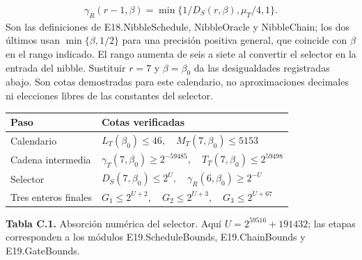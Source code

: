 \documentclass[spanish,11pt,a4paper]{article}
\newcounter{none}
\begin{document}
\[\begin{gathered}
\gamma_R(r-1,\beta)=\min\{1/D_S(r,\beta),\mu_T/4,1\}.
\end{gathered}
\] Son las definiciones de {\ttfamily\small E18.\discretionary{\hbox{\ensuremath{\hookrightarrow}}}{}{}NibbleSchedu\discretionary{\hbox{\ensuremath{\hookrightarrow}}}{}{}le}, {\ttfamily\small NibbleOracle} y {\ttfamily\small NibbleChain}; los dos últimos usan \(\min\{\beta,1/2\}\) para una precisión positiva general, que coincide con \(\beta\) en el rango indicado. El rango aumenta de seis a siete al convertir el selector en la entrada del nibble. Sustituir \(r=7\) y \(\beta=\beta_0\) da las desigualdades registradas abajo. Son cotas demostradas para este calendario, no aproximaciones decimales ni elecciones libres de las constantes del selector.


{\def\LTcaptype{none} %
\begin{longtable}[c]{@{}
  >{\raggedright\arraybackslash}p{}
  >{\raggedright\arraybackslash}p{}@{}}
\toprule\noalign{}
\begin{minipage}[b]{\linewidth}\raggedright
Paso
\end{minipage} & \begin{minipage}[b]{\linewidth}\raggedright
Cotas verificadas
\end{minipage} \\
\midrule\noalign{}
\endhead
\bottomrule\noalign{}
\endlastfoot
Calendario & \(L_T(\beta_0)\le46,\quad M_T(7,\beta_0)\le5153\) \\
Cadena intermedia & \(\gamma_T(7,\beta_0)\ge2^{-59485},\quad T_T(7,\beta_0)\le2^{59498}\) \\
Selector & \(D_S(7,\beta_0)\le2^U,\quad \gamma_R(6,\beta_0)\ge2^{-U}\) \\
Tres enteros finales & \(G_1\le2^{U+2},\quad G_2\le2^{U+3},\quad G_3\le2^{U+67}\) \\
\end{longtable}
}

\textbf{Tabla C.1.} Absorción numérica del selector. Aquí \(U=2^{59516}+191432\); las etapas corresponden a los módulos {\ttfamily\small E19.\discretionary{\hbox{\ensuremath{\hookrightarrow}}}{}{}ScheduleBoun\discretionary{\hbox{\ensuremath{\hookrightarrow}}}{}{}ds}, {\ttfamily\small E19.\discretionary{\hbox{\ensuremath{\hookrightarrow}}}{}{}ChainBounds} y {\ttfamily\small E19.\discretionary{\hbox{\ensuremath{\hookrightarrow}}}{}{}GateBounds}.
\end{document}
